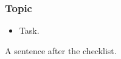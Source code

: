 \subsubsection{Topic}

\begin{itemize}[label=\unchecked]
\item Task.
\end{itemize}

A sentence after the checklist.
